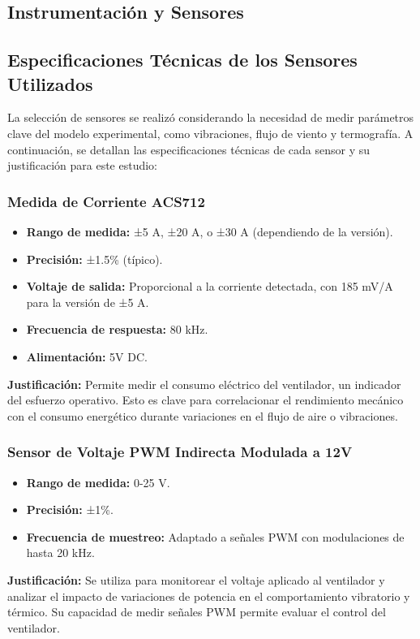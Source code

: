 \documentclass[journal,article,submit,pdftex,moreauthors]{Definitions/mdpi}
\begin{document}
\subsection{Instrumentación y Sensores}

\subsection{Especificaciones Técnicas de los Sensores Utilizados}

La selección de sensores se realizó considerando la necesidad de medir parámetros clave del modelo experimental, como vibraciones, flujo de viento y termografía. A continuación, se detallan las especificaciones técnicas de cada sensor y su justificación para este estudio:

\subsubsection{Medida de Corriente ACS712}
\begin{itemize}
    \item \textbf{Rango de medida:} ±5 A, ±20 A, o ±30 A (dependiendo de la versión).
    \item \textbf{Precisión:} ±1.5\% (típico).
    \item \textbf{Voltaje de salida:} Proporcional a la corriente detectada, con 185 mV/A para la versión de ±5 A.
    \item \textbf{Frecuencia de respuesta:} 80 kHz.
    \item \textbf{Alimentación:} 5V DC.
\end{itemize}
\textbf{Justificación:} Permite medir el consumo eléctrico del ventilador, un indicador del esfuerzo operativo. Esto es clave para correlacionar el rendimiento mecánico con el consumo energético durante variaciones en el flujo de aire o vibraciones.

\subsubsection{Sensor de Voltaje PWM Indirecta Modulada a 12V}
\begin{itemize}
    \item \textbf{Rango de medida:} 0-25 V.
    \item \textbf{Precisión:} ±1\%.
    \item \textbf{Frecuencia de muestreo:} Adaptado a señales PWM con modulaciones de hasta 20 kHz.
\end{itemize}
\textbf{Justificación:} Se utiliza para monitorear el voltaje aplicado al ventilador y analizar el impacto de variaciones de potencia en el comportamiento vibratorio y térmico. Su capacidad de medir señales PWM permite evaluar el control del ventilador.
\end{document}
